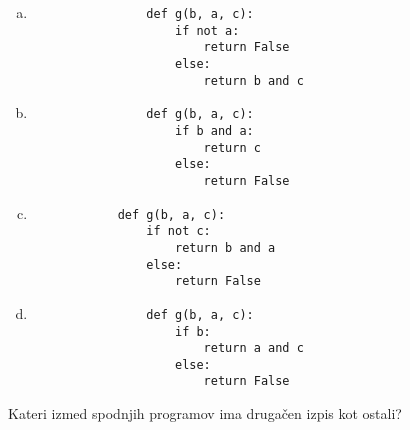 \documentclass[arhiv, 10pt]{../izpit}
\begin{document}
        \begin{multicols}{2}
        \begin{enumerate}[(a)]
\item 
                \begin{verbatim}
                def g(b, a, c):
                    if not a:
                        return False
                    else:
                        return b and c
                \end{verbatim}
            
\item 
                \begin{verbatim}
                def g(b, a, c):
                    if b and a:
                        return c
                    else:
                        return False
                \end{verbatim}
            
\item 
            \begin{verbatim}
            def g(b, a, c):
                if not c:
                    return b and a
                else:
                    return False
            \end{verbatim}
        
\item 
                \begin{verbatim}
                def g(b, a, c):
                    if b:
                        return a and c
                    else:
                        return False
                \end{verbatim}
            
\end{enumerate}

        \end{multicols}
    
        \naloga*
        
        Kateri izmed spodnjih programov ima drugačen izpis kot ostali?
    
\end{document}
